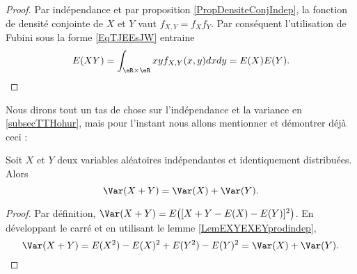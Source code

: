 \begin{proof}
    Par indépendance et par proposition \ref{PropDensiteConjIndep}, la fonction de densité conjointe de \( X\) et \( Y\) vaut \( f_{X,Y}=f_Xf_Y\). Par conséquent l'utilisation de Fubini sous la forme \eqref{EqTJEEsJW} entraine
    \begin{equation}
        E(XY)=\int_{\eR\times\eR}xyf_{X,Y}(x,y)dxdy=E(X)E(Y).
    \end{equation}
\end{proof}

Nous dirons tout un tas de chose sur l'indépendance et la variance en \ref{subsecTTHohur}, mais pour l'instant nous allons mentionner et démontrer déjà ceci :
\begin{lemma}   \label{LemVarXpYsmindep}
    Soit \( X\) et \( Y\) deux variables aléatoires indépendantes et identiquement distribuées. Alors
    \begin{equation}
        \Var(X+Y)=\Var(X)+\Var(Y).
    \end{equation}
\end{lemma}

\begin{proof}
    Par définition, \( \Var(X+Y)=E\big( [X+Y-E(X)-E(Y)]^2 \big)\). En développant le carré et en utilisant le lemme \ref{LemEXYEXEYprodindep},
    \begin{equation}
        \Var(X+Y)=E(X^2)-E(X)^2+E(Y^2)-E(Y)^2=\Var(X)+\Var(Y).
    \end{equation}
\end{proof}

